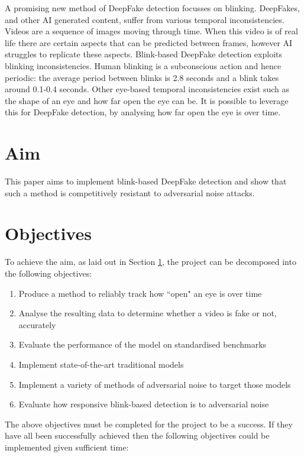 A promising new method of DeepFake detection focusses on blinking. DeepFakes, and other AI generated content, suffer from various temporal inconsistencies. Videos are a sequence of images moving through time. When this video is of real life there are certain aspects that can be predicted between frames, however AI struggles to replicate these aspects. Blink-based DeepFake detection exploits blinking inconsistencies. Human blinking is a subconscious action and hence periodic: the average period between blinks is 2.8 seconds and a blink takes around 0.1-0.4 seconds\cite{schiffman1990sensation}. Other eye-based temporal inconsistencies exist such as the shape of an eye and how far open the eye can be. It is possible to leverage this for DeepFake detection, by analysing how far open the eye is over time.

\section{Aim}
\label{sec:aim}

This paper aims to implement blink-based DeepFake detection and show that such a method is competitively resistant to adversarial noise attacks.

\section{Objectives}
\label{sec:objectives}

To achieve the aim, as laid out in Section \ref{sec:aim}, the project can be decomposed into the following objectives:

\begin{enumerate}
    \item Produce a method to reliably track how ``open" an eye is over time
    \item Analyse the resulting data to determine whether a video is fake or not, accurately
    \item Evaluate the performance of the model on standardised benchmarks
    \item Implement state-of-the-art traditional models
    \item Implement a variety of methods of adversarial noise to target those models
    \item Evaluate how responsive blink-based detection is to adversarial noise
\end{enumerate}

The above objectives must be completed for the project to be a success. If they have all been successfully achieved then the following objectives could be implemented given sufficient time:

